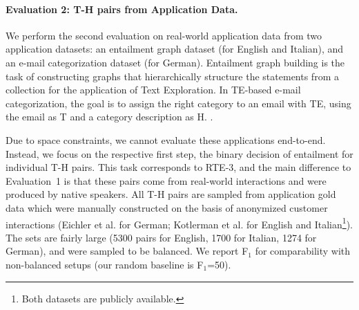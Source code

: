 \documentclass[11pt,letterpaper]{article}
\begin{document}
\paragraph{Evaluation 2: T-H pairs from Application Data.}
We perform the second evaluation on real-world application data from
two application datasets: an entailment graph dataset (for English and
Italian), and an e-mail categorization dataset (for German).
Entailment graph building is the task of constructing graphs that
hierarchically structure the statements from a collection
\cite{berant2012learning} for the application of Text Exploration.  In
TE-based e-mail categorization, the goal is to assign the right
category to an email with TE, using the email as T and a category
description as H. \cite{Eichler:2014}.

Due to space constraints, we cannot evaluate these applications
end-to-end. Instead, we focus on the respective first step, the binary
decision of entailment for individual T-H pairs. This task corresponds
to RTE-3, and the main difference to Evaluation~1 is that these pairs
come from real-world interactions and were produced by native
speakers.  All T-H pairs %
are sampled from application gold data which were manually constructed
on the basis of anonymized customer interactions (Eichler et
al.  for German; Kotlerman et
al.  for English and Italian\footnote{Both
  datasets are publicly available.}). The sets are fairly large (5300
pairs for English, 1700 for Italian, 1274 for German), and were
sampled to be balanced. We report F$_1$ for comparability with
non-balanced setups (our random baseline is F$_1$=50). 


\end{document}
